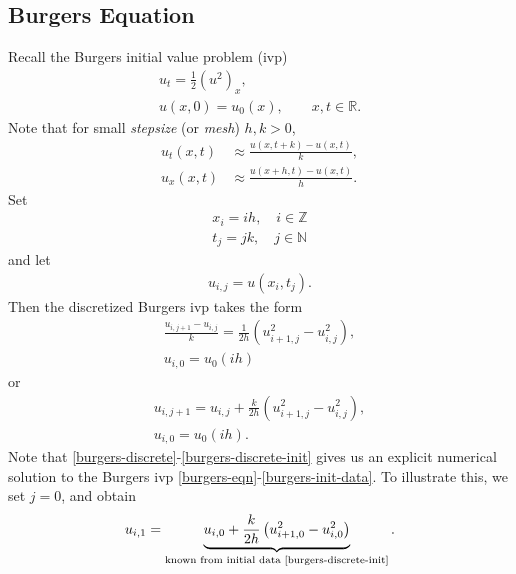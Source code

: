 \documentclass[12pt]{article}
\newcommand{\rr}{\mathbb{R}}
\theoremstyle{plain}
\theoremstyle{definition}
\theoremstyle{remark}
\numberwithin{equation}{section}  %
\begin{document}
		\subsection{Burgers Equation}
		Recall the Burgers initial value problem (ivp)
		\begin{gather}
			\label{burgers-eqn}
			u_{t} = \frac{1}{2}(u^{2})_{x},
			\\
			\label{burgers-init-data}
			u(x, 0) = u_{0}(x), \qquad x, t \in \rr.
		\end{gather}
		Note that for small \emph{stepsize} (or \emph{mesh}) $h, k >0$,
		\begin{equation*}
			\begin{split}
				u_{t}(x,t) &\approx \frac{u(x, t+k) - u(x, t)}{k},
				\\
				u_{x}(x, t) & \approx \frac{u(x+h, t) - u(x, t)}{h}.
			\end{split}
		\end{equation*}
		Set
		\begin{gather*}
			x_i = ih, \quad i \in \mathbb{Z}
			\\
			t_{j}=jk, \quad j \in \mathbb{N}
		\end{gather*}
		and let
		\begin{gather*}
			u_{i,j} = u(x_{i}, t_{j}).
		\end{gather*}
		Then the discretized Burgers ivp takes the form
		\begin{gather*}
			\frac{u_{i, j+1}- u_{i,j}}{k}=\frac{1}{2h}\left( u_{i+1,j}^{2} -
			u_{i,j}^{2} \right),
			\\
			u_{i,0} = u_{0}(ih)
		\end{gather*}
		or
		\begin{gather}
			\label{burgers-discrete}
			u_{i, j+1}=u_{i,j} + \frac{k}{2h}\left( u_{i+1,j}^{2} -
			u_{i,j}^{2} \right),
			\\
			\label{burgers-discrete-init}
			u_{i,0} = u_{0}(ih).
		\end{gather}
		Note that \eqref{burgers-discrete}-\eqref{burgers-discrete-init} gives us an
		explicit numerical solution to the Burgers ivp
		\eqref{burgers-eqn}-\eqref{burgers-init-data}. To illustrate this, we set
		$j=0$, and obtain
		\begin{equation}
			\label{case-j=0}
			\begin{split}
				u_{i,1} = \underbrace{u_{i,0} + \frac{k}{2h}\left( u_{i+1,0}^{2} -
				u_{i,0}^{2} \right)}_{\text{known from initial data
				\eqref{burgers-discrete-init}}}.
			\end{split}
		\end{equation}
\end{document}
